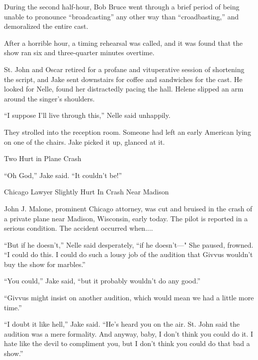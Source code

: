 \documentclass{novel}
\begin{document}
During the second half-hour, Bob Bruce went through a brief period of being unable to pronounce “broadcasting” any other way than “croadbasting,” and demoralized the entire cast.

After a horrible hour, a timing rehearsal was called, and it was found that the show ran six and three-quarter minutes overtime.

St. John and Oscar retired for a profane and vituperative session of shortening the script, and Jake sent downstairs for coffee and sandwiches for the cast. He looked for Nelle, found her distractedly pacing the hall. Helene slipped an arm around the singer’s shoulders.

“I suppose I'll live through this,” Nelle said unhappily.

They strolled into the reception room. Someone had left an early American lying on one of the chairs. Jake picked it up, glanced at it.

Two Hurt in Plane Crash

“Oh God,” Jake said. “It couldn’t be!”

Chicago Lawyer Slightly Hurt In Crash Near Madison

John J. Malone, prominent Chicago attorney, was cut and bruised in the crash of a private plane near Madison, Wisconsin, early today. The pilot is reported in a serious condition. The accident occurred when....

\begin{ChapterStart}
\vspace{3\nbs}
\end{ChapterStart}

“But if he doesn’t,” Nelle said desperately, “if he doesn’t—" She paused, frowned. “I could do this. I could do such a lousy job of the audition that Givvus wouldn’t buy the show for marbles.”

“You could,” Jake said, “but it probably wouldn’t do any good.”

“Givvus might insist on another audition, which would mean we had a little more time.”

“I doubt it like hell,” Jake said. “He’s heard you on the air. St. John said the audition was a mere formality. And anyway, baby, I don’t think you could do it. I hate like the devil to compliment you, but I don’t think you could do that bad a show.”
\end{document}
